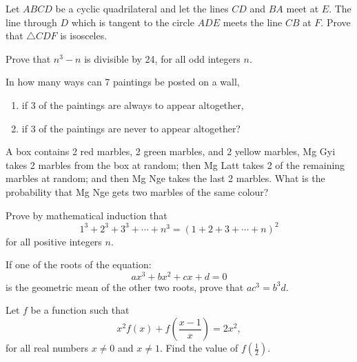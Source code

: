 \begin{problems}
    \problem Let $ABCD$ be a cyclic quadrilateral and let the lines $CD$ and
    $BA$ meet at $E$. The line through $D$ which is tangent to the circle $ADE$
    meets the line $CB$ at $F$. Prove that $\triangle CDF$ is isosceles. 

    \problem Prove that $n^3 - n$ is divisible by 24, for all odd integers $n$. 

    \problem In how many ways can 7 paintings be posted on a wall,
    \begin{enumerate} \item if 3 of the paintings are always to appear
        altogether,
        
        \item if 3 of the paintings are never to appear altogether?
    \end{enumerate}

    \problem A box contains 2 red marbles, 2 green marbles, and 2 yellow
    marbles, Mg Gyi takes 2 marbles from the box at random; then Mg Latt takes
    2 of the remaining marbles at random; and then Mg Nge takes the last 2
    marbles. What is the probability that Mg Nge gets two marbles of the same
    colour?

    \problem Prove by mathematical induction that \[1^3 + 2^3 + 3^3 + \cdots +
    n^3 =(1 + 2 + 3 + \cdots + n)^2\] for all positive integers $n$. 

    \problem If one of the roots of the equation: \[ax^3 + bx^2 + cx + d = 0\]
    is the geometric mean of the other two roots, prove that $ac^3 = b^3d$.
    
    \problem Let $f$ be a function such that \[x^2f(x) +
    f\left(\frac{x-1}{x}\right) = 2x^2,\] for all real numbers $x \ne 0$ and $x
    \ne 1$. Find the value of $f\left(\frac{1}{2}\right)$. 
\end{problems}
